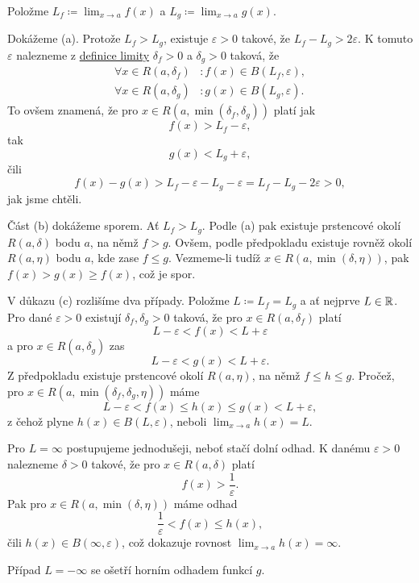 \begin{thmproof}
 Položme $L_f \coloneqq \lim_{x \to a} f(x)$ a $L_g \coloneqq \lim_{x \to a}
 g(x)$.

 Dokážeme (a). Protože $L_f > L_g$, existuje $\varepsilon > 0$ takové, že $L_f -
 L_g > 2\varepsilon$. K tomuto $\varepsilon$ nalezneme z
 \hyperref[def:oboustranna-limita-funkce]{definice limity} $\delta_f > 0$ a
 $\delta_g > 0$ taková, že
 \begin{align*}
  \forall x \in R(a,\delta_f) &: f(x) \in B(L_f,\varepsilon),\\
  \forall x \in R(a,\delta_g)&: g(x) \in B(L_g,\varepsilon).
 \end{align*}
 To ovšem znamená, že pro $x \in R(a,\min(\delta_f,\delta_g))$ platí jak
 \[
  f(x) > L_f - \varepsilon,
 \]
 tak
 \[
  g(x) < L_g + \varepsilon,
 \]
 čili
 \[
  f(x) - g(x) > L_f - \varepsilon - L_g - \varepsilon = L_f - L_g - 2\varepsilon
  > 0,
 \]
 jak jsme chtěli.

 Část (b) dokážeme sporem. Ať $L_f > L_g$. Podle (a) pak existuje prstencové
 okolí $R(a,\delta)$ bodu $a$, na němž $f > g$. Ovšem, podle předpokladu
 existuje rovněž okolí $R(a,\eta)$ bodu $a$, kde zase $f \leq g$. Vezmeme-li
 tudíž $x \in R(a,\min(\delta,\eta))$, pak $f(x) > g(x) \geq f(x)$, což je spor.

 V důkazu (c) rozlišíme dva případy. Položme $L \coloneqq L_f = L_g$ a ať
 nejprve $L \in \mathbb{R}$. Pro dané $\varepsilon>0$ existují $\delta_f,\delta_g>0$
 taková, že pro $x \in R(a,\delta_f)$ platí
 \[
  L - \varepsilon< f(x) < L + \varepsilon
 \]
 a pro $x \in R(a,\delta_g)$ zas
 \[
  L - \varepsilon < g(x) < L + \varepsilon.
 \]
 Z předpokladu existuje prstencové okolí $R(a,\eta)$, na němž $f \leq h \leq g$.
 Pročež, pro $x \in R(a,\min(\delta_f,\delta_g,\eta))$ máme
 \[
  L - \varepsilon < f(x) \leq h(x) \leq g(x) < L + \varepsilon,
 \]
 z čehož plyne $h(x) \in B(L,\varepsilon)$, neboli $\lim_{x \to a} h(x) = L$.

 Pro $L = \infty$ postupujeme jednodušeji, neboť stačí dolní odhad. K danému
 $\varepsilon>0$ nalezneme $\delta>0$ takové, že pro $x \in R(a,\delta)$ platí
 \[
  f(x) > \frac{1}{\varepsilon}.
 \]
 Pak pro $x \in R(a,\min(\delta,\eta))$ máme odhad
 \[
  \frac{1}{\varepsilon} < f(x) \leq h(x),
 \]
 čili $h(x) \in B(\infty,\varepsilon)$, což dokazuje rovnost $\lim_{x \to a}
 h(x) = \infty$. 

 Případ $L = -\infty$ se ošetří horním odhadem funkcí $g$.
\end{thmproof}
